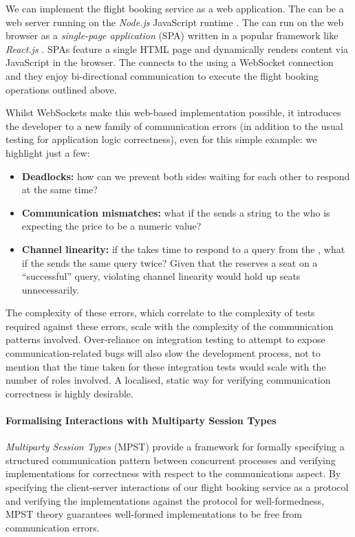 We can implement the flight booking service as a web
application.
The  can be a web server
running on the \textit{Node.js} JavaScript runtime \cite{nodejs}.
The  can run on the web browser
as a \textit{single-page application} (SPA) written
in a popular framework like \textit{React.js} \cite{React}.
SPAs feature a single HTML page and dynamically renders
content via JavaScript in the browser.
The  connects to the 
using a WebSocket connection and they enjoy
bi-directional communication to execute the flight
booking operations outlined above.

Whilst WebSockets make this web-based implementation possible, 
it introduces the developer to a new family of communication errors
(in addition to the usual testing for application logic correctness), 
even for this simple example:
we highlight just a few:

\begin{itemize}

\item
\textbf{Deadlocks:} how can we prevent both sides waiting for 
each other to respond at the same time?

\item 
\textbf{Communication mismatches:} what if the 
 sends a string to the 
who is expecting the price to be a numeric value?

\item
\textbf{Channel linearity:} if the 
takes time to respond to a query from the ,
what if the  sends the same query twice? 
Given that the  reserves a seat on
a ``successful'' query, violating channel linearity
would hold up seats unnecessarily.

\end{itemize}

The complexity of these errors,
which correlate to the complexity of tests 
required against these errors, 
scale with the complexity of the 
communication patterns involved. 
Over-reliance on integration testing
to attempt to expose communication-related bugs 
will also slow the
development process, not to mention that the time 
taken for these
integration tests would scale with the number of roles involved.
A localised, static way for verifying communication correctness
is highly desirable.

\paragraph{Formalising Interactions with
Multiparty Session Types}
\textit{Multiparty Session Types} (MPST) \cite{MPST} 
provide a framework for formally specifying 
a structured communication pattern 
between concurrent processes and 
verifying implementations for 
correctness with respect to the communications aspect. 
By specifying the client-server interactions of 
our flight booking service as a protocol 
and verifying the implementations against 
the protocol for well-formedness, 
MPST theory guarantees well-formed 
implementations to be free from communication errors.

